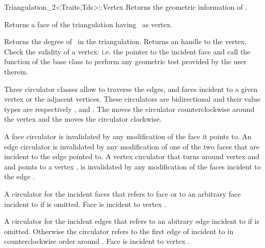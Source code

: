 \begin{ccRefClass}{Triangulation_2<Traits,Tds>::Vertex}
\ccAccessFunctions
{}
{Returns  the geometric information of \ccVar.}

{Returns a face of the triangulation having  \ccVar\ as vertex.}

\begin{ccAdvanced}
\end{ccAdvanced}

{Returns the degree of \ccVar\ in the triangulation.}
\ccGlue
{}
{Returns an handle to the vertex.}
\ccGlue
{} 
{Check the validity of a vertex:
i.e. the pointer to the incident face  and call the 
function of the base class to perform any geometric test provided by the user
therein.}


Three circulator classes allow to traverse the edges, and faces
incident to a given vertex or  the adjacent vertices.
 These circulators are bidirectional
and their value types are respectively , 
and .
The   moves the circulator
counterclockwise around the vertex 
and  the  moves the circulator
clockwise. 

A face circulator is invalidated by any modification of the face it
points to. An edge circulator is invalidated
by any modification of one of the two faces that are incident to the edge
pointed to.  A vertex circulator that turns around vertex 
and and points  to a vertex , is invalidated
by any modification of the faces incident to the edge .




{A circulator for the  incident faces 
that refers to face  or to an arbitrary face
incident to   if  is omitted.
\ccPrecond Face  is incident to vertex .}

{A circulator for the incident edges that refers to an abitrary edge incident
to  if  is omitted. Otherwise the circulator refers
to the first edge of 
incident
to  in counterclockwise order around .
\ccPrecond Face  is incident to vertex . }


\end{ccRefClass}
